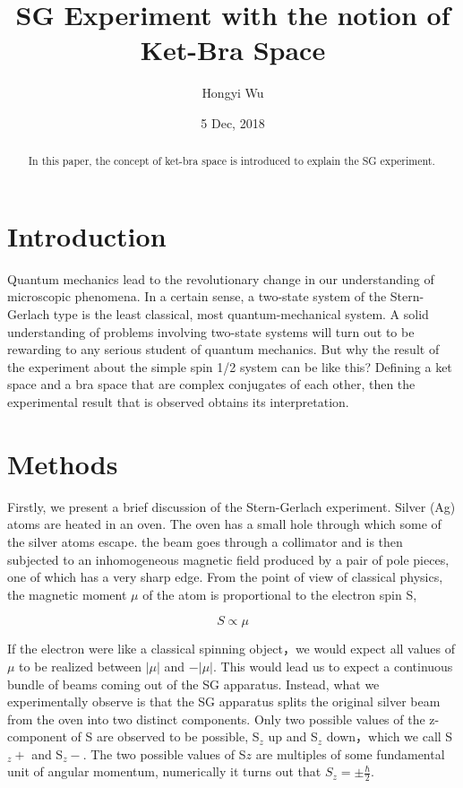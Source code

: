 \documentclass[a4paper]{article}
\begin{document}
\title{SG Experiment with the notion of Ket-Bra Space}
\author{Hongyi Wu}
\date{5 Dec, 2018}
\maketitle

\begin{abstract}
In this paper, the concept of ket-bra space is introduced to explain the SG experiment.
\end{abstract}

\section{Introduction}
Quantum mechanics lead to the revolutionary change in our understanding of microscopic phenomena. In a certain sense, a two-state system of the Stern-Gerlach type is the least classical, most quantum-mechanical system. A solid understanding of problems involving two-state systems will turn out to be rewarding to any serious student of quantum mechanics. But why the result of the experiment about the simple spin 1/2 system can be like this? Defining a ket space and a bra space that are complex conjugates of each other, then the experimental result that is observed obtains its interpretation.
\section{Methods}

\cite{Stern1922}Firstly, we present a brief discussion of the Stern-Gerlach experiment. 
Silver (Ag) atoms are heated in an oven. The oven has a small hole through which some of the silver atoms escape. the beam goes through a collimator and is then subjected to an inhomogeneous magnetic field produced by a pair of pole pieces, one of which has a very sharp edge. From the point of view of classical physics, the magnetic moment $\mu$ of the atom is proportional to the electron spin S,

\begin{equation}
S \propto \mu 
\end{equation}

If the electron were like a classical spinning object，we would expect all values of $\mu$ to be realized between $|\mu|$ and $-|\mu|$. This would lead us to expect a continuous bundle of beams coming out of the SG apparatus. Instead, what we experimentally observe is that the SG apparatus splits the original silver beam from the oven into two distinct components. Only two possible values of the z-component of S are observed to be possible, S$_z$ up and S$_z$ down，which we call S$_z+$ and S$_z-$. The two possible values of S$z$ are multiples of some fundamental unit of angular momentum, numerically it turns out that $S_{z} = \pm \frac{\hbar}{2}$.
\end{document}
